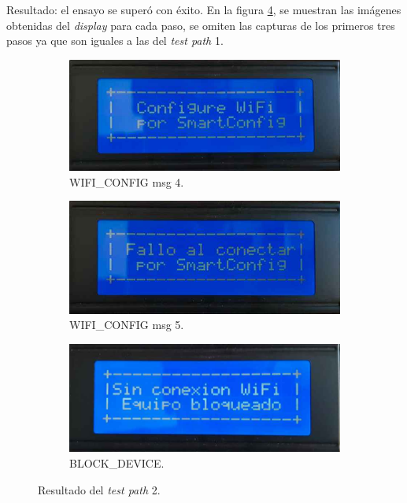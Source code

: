Resultado: el ensayo se superó con éxito. En la figura \ref{fig:pruIni_2_res}, se muestran las imágenes obtenidas del \textit{display} para cada paso, se omiten las capturas de los primeros tres pasos ya que son iguales a las del \textit{test path} 1. 
 
\begin{figure}[!htpb]
     \centering
     \begin{subfigure}[b]{0.4\textwidth}
         \centering
         \includegraphics[width=1.1\textwidth]{./Figures/Conf_SmartConf.jpeg}
         \caption{WIFI\_CONFIG msg 4.}
         \label{fig:pruIni_2_1}
     \end{subfigure}
           \hfill
     \begin{subfigure}[b]{0.4\textwidth}
         \centering
         \includegraphics[width=1.1\textwidth]{./Figures/Fallo_SmartConf.jpeg}
         \caption{WIFI\_CONFIG msg 5.}
         \label{fig:pruIni_2_2}
     \end{subfigure}
           \hfill
     \begin{subfigure}[b]{0.4\textwidth}
         \centering
         \includegraphics[width=1.1\textwidth]{./Figures/Sin_Conex_WiFi_Eq_Bloq.jpeg}
         \caption{BLOCK\_DEVICE.}
         \label{fig:pruIni_2_3}
     \end{subfigure}
        \caption{Resultado del \textit{test path} 2.}
        \label{fig:pruIni_2_res}
\end{figure}

